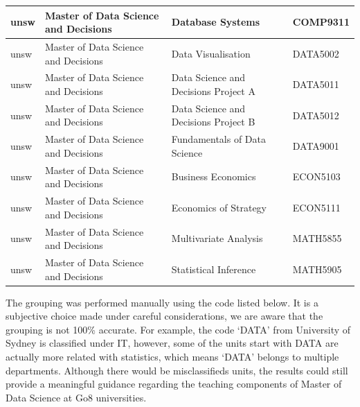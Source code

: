 \documentclass[
  letterpaper,
  DIV=11,
  numbers=noendperiod]{scrreport}
\begin{document}
\begin{table}
\begin{tabular}{l|l|l|l}
\hline
unsw & Master of Data Science and Decisions & Database Systems & COMP9311\\
\hline
unsw & Master of Data Science and Decisions & Data Visualisation & DATA5002\\
\hline
unsw & Master of Data Science and Decisions & Data Science and Decisions Project A & DATA5011\\
\hline
unsw & Master of Data Science and Decisions & Data Science and Decisions Project B & DATA5012\\
\hline
unsw & Master of Data Science and Decisions & Fundamentals of Data Science & DATA9001\\
\hline
unsw & Master of Data Science and Decisions & Business Economics & ECON5103\\
\hline
unsw & Master of Data Science and Decisions & Economics of Strategy & ECON5111\\
\hline
unsw & Master of Data Science and Decisions & Multivariate Analysis & MATH5855\\
\hline
unsw & Master of Data Science and Decisions & Statistical Inference & MATH5905\\
\hline
\end{tabular}
\end{table}

The grouping was performed manually using the code listed below. It is a
subjective choice made under careful considerations, we are aware that
the grouping is not 100\% accurate. For example, the code `DATA' from
University of Sydney is classified under IT, however, some of the units
start with DATA are actually more related with statistics, which means
`DATA' belongs to multiple departments. Although there would be
misclassifieds units, the results could still provide a meaningful
guidance regarding the teaching components of Master of Data Science at
Go8 universities.
\end{document}
